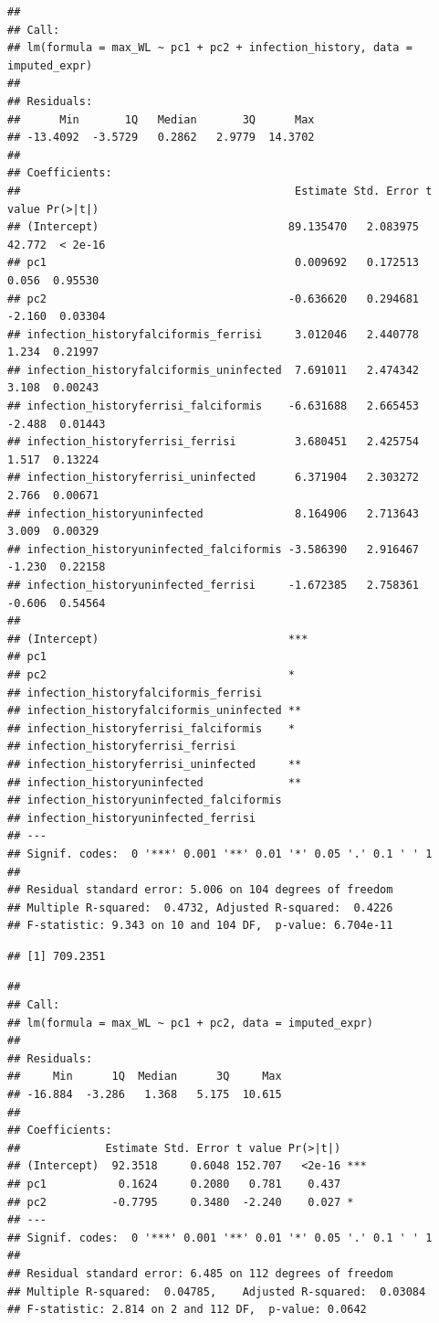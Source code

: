 \documentclass[
]{article}
\begin{document}
\begin{verbatim}
## 
## Call:
## lm(formula = max_WL ~ pc1 + pc2 + infection_history, data = imputed_expr)
## 
## Residuals:
##      Min       1Q   Median       3Q      Max 
## -13.4092  -3.5729   0.2862   2.9779  14.3702 
## 
## Coefficients:
##                                          Estimate Std. Error t value Pr(>|t|)
## (Intercept)                             89.135470   2.083975  42.772  < 2e-16
## pc1                                      0.009692   0.172513   0.056  0.95530
## pc2                                     -0.636620   0.294681  -2.160  0.03304
## infection_historyfalciformis_ferrisi     3.012046   2.440778   1.234  0.21997
## infection_historyfalciformis_uninfected  7.691011   2.474342   3.108  0.00243
## infection_historyferrisi_falciformis    -6.631688   2.665453  -2.488  0.01443
## infection_historyferrisi_ferrisi         3.680451   2.425754   1.517  0.13224
## infection_historyferrisi_uninfected      6.371904   2.303272   2.766  0.00671
## infection_historyuninfected              8.164906   2.713643   3.009  0.00329
## infection_historyuninfected_falciformis -3.586390   2.916467  -1.230  0.22158
## infection_historyuninfected_ferrisi     -1.672385   2.758361  -0.606  0.54564
##                                            
## (Intercept)                             ***
## pc1                                        
## pc2                                     *  
## infection_historyfalciformis_ferrisi       
## infection_historyfalciformis_uninfected ** 
## infection_historyferrisi_falciformis    *  
## infection_historyferrisi_ferrisi           
## infection_historyferrisi_uninfected     ** 
## infection_historyuninfected             ** 
## infection_historyuninfected_falciformis    
## infection_historyuninfected_ferrisi        
## ---
## Signif. codes:  0 '***' 0.001 '**' 0.01 '*' 0.05 '.' 0.1 ' ' 1
## 
## Residual standard error: 5.006 on 104 degrees of freedom
## Multiple R-squared:  0.4732, Adjusted R-squared:  0.4226 
## F-statistic: 9.343 on 10 and 104 DF,  p-value: 6.704e-11
\end{verbatim}

\begin{verbatim}
## [1] 709.2351
\end{verbatim}

\begin{verbatim}
## 
## Call:
## lm(formula = max_WL ~ pc1 + pc2, data = imputed_expr)
## 
## Residuals:
##     Min      1Q  Median      3Q     Max 
## -16.884  -3.286   1.368   5.175  10.615 
## 
## Coefficients:
##             Estimate Std. Error t value Pr(>|t|)    
## (Intercept)  92.3518     0.6048 152.707   <2e-16 ***
## pc1           0.1624     0.2080   0.781    0.437    
## pc2          -0.7795     0.3480  -2.240    0.027 *  
## ---
## Signif. codes:  0 '***' 0.001 '**' 0.01 '*' 0.05 '.' 0.1 ' ' 1
## 
## Residual standard error: 6.485 on 112 degrees of freedom
## Multiple R-squared:  0.04785,    Adjusted R-squared:  0.03084 
## F-statistic: 2.814 on 2 and 112 DF,  p-value: 0.0642
\end{verbatim}
\end{document}
